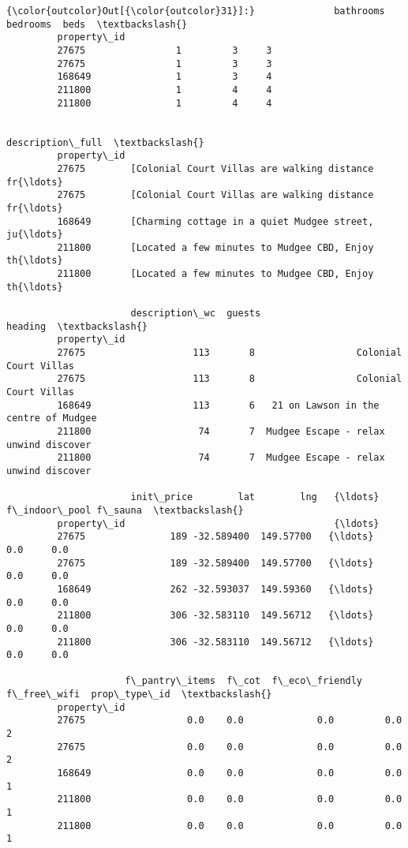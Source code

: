 \documentclass[11pt]{article}
\begin{document}
\begin{Verbatim}[commandchars=\\\{\}]
{\color{outcolor}Out[{\color{outcolor}31}]:}              bathrooms  bedrooms  beds  \textbackslash{}
         property\_id                              
         27675                1         3     3   
         27675                1         3     3   
         168649               1         3     4   
         211800               1         4     4   
         211800               1         4     4   
         
                                                       description\_full  \textbackslash{}
         property\_id                                                      
         27675        [Colonial Court Villas are walking distance fr{\ldots}   
         27675        [Colonial Court Villas are walking distance fr{\ldots}   
         168649       [Charming cottage in a quiet Mudgee street, ju{\ldots}   
         211800       [Located a few minutes to Mudgee CBD, Enjoy th{\ldots}   
         211800       [Located a few minutes to Mudgee CBD, Enjoy th{\ldots}   
         
                      description\_wc  guests                                heading  \textbackslash{}
         property\_id                                                                  
         27675                   113       8                  Colonial Court Villas   
         27675                   113       8                  Colonial Court Villas   
         168649                  113       6   21 on Lawson in the centre of Mudgee   
         211800                   74       7  Mudgee Escape - relax unwind discover   
         211800                   74       7  Mudgee Escape - relax unwind discover   
         
                      init\_price        lat        lng   {\ldots}    f\_indoor\_pool f\_sauna  \textbackslash{}
         property\_id                                     {\ldots}                            
         27675               189 -32.589400  149.57700   {\ldots}              0.0     0.0   
         27675               189 -32.589400  149.57700   {\ldots}              0.0     0.0   
         168649              262 -32.593037  149.59360   {\ldots}              0.0     0.0   
         211800              306 -32.583110  149.56712   {\ldots}              0.0     0.0   
         211800              306 -32.583110  149.56712   {\ldots}              0.0     0.0   
         
                     f\_pantry\_items  f\_cot  f\_eco\_friendly f\_free\_wifi  prop\_type\_id  \textbackslash{}
         property\_id                                                                   
         27675                  0.0    0.0             0.0         0.0             2   
         27675                  0.0    0.0             0.0         0.0             2   
         168649                 0.0    0.0             0.0         0.0             1   
         211800                 0.0    0.0             0.0         0.0             1   
         211800                 0.0    0.0             0.0         0.0             1   
         

\end{Verbatim}
\end{document}
